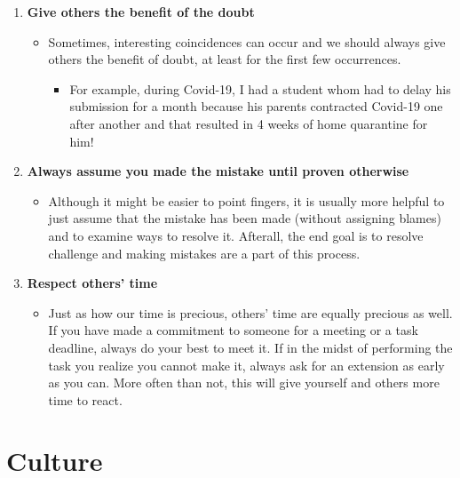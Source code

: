 \documentclass[
]{book}
\providecommand{\tightlist}{%
  \setlength{\itemsep}{0pt}\setlength{\parskip}{0pt}}
\begin{document}
\begin{enumerate}
\def\labelenumi{\arabic{enumi}.}
\tightlist
\item
  \textbf{Give others the benefit of the doubt}

  \begin{itemize}
  \tightlist
  \item
    Sometimes, interesting coincidences can occur and we should always give others the benefit of doubt, at least for the first few occurrences.

    \begin{itemize}
    \tightlist
    \item
      For example, during Covid-19, I had a student whom had to delay his submission for a month because his parents contracted Covid-19 one after another and that resulted in 4 weeks of home quarantine for him!
    \end{itemize}
  \end{itemize}
\item
  \textbf{Always assume you made the mistake until proven otherwise}

  \begin{itemize}
  \tightlist
  \item
    Although it might be easier to point fingers, it is usually more helpful to just assume that the mistake has been made (without assigning blames) and to examine ways to resolve it. Afterall, the end goal is to resolve challenge and making mistakes are a part of this process.
  \end{itemize}
\item
  \textbf{Respect others' time}

  \begin{itemize}
  \tightlist
  \item
    Just as how our time is precious, others' time are equally precious as well. If you have made a commitment to someone for a meeting or a task deadline, always do your best to meet it. If in the midst of performing the task you realize you cannot make it, always ask for an extension as early as you can. More often than not, this will give yourself and others more time to react.
  \end{itemize}
\end{enumerate}

\hypertarget{culture}{%
\section{Culture}\label{culture}}
\end{document}
